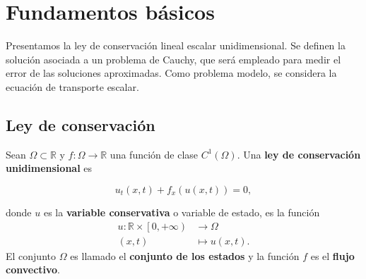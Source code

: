 \chapter{Fundamentos básicos}\label{ch:fundaments}

Presentamos la ley de conservación lineal escalar unidimensional.
Se definen la solución asociada a un problema de Cauchy, que será
empleado para medir el error de las soluciones aproximadas.
Como problema modelo, se considera la ecuación de transporte escalar.

\section{Ley de conservación}

\begin{definition}
  Sean
  \begin{math}
    \Omega\subset
    \mathbb{R}
  \end{math}
  y
  \begin{math}
    f\colon\Omega\to
    \mathbb{R}
  \end{math}
  una función de clase
  \begin{math}
    C^{1}
    \left(\Omega\right)
  \end{math}.
  Una \textbf{ley de conservación unidimensional} es

  \begin{equation}\label{eq:differentialconservationlaw}
    u_{t}
    \left(x,t\right)+
    f_{x}
    \left(
    u\left(x,t\right)
    \right)=
    0,
  \end{equation}

  donde $u$ es la \textbf{variable conservativa} o variable de
  estado, es la función
  \begin{align*}
    u\colon\mathbb{R}\times
    \left[0,+\infty\right) &
    \longrightarrow
    \Omega                   \\
    \left(x,t\right)       &
    \longmapsto
    u\left(x,t\right).
  \end{align*}
  El conjunto $\Omega$ es llamado el \textbf{conjunto de los estados}
  y la función $f$ es el \textbf{flujo convectivo}.
\end{definition}

